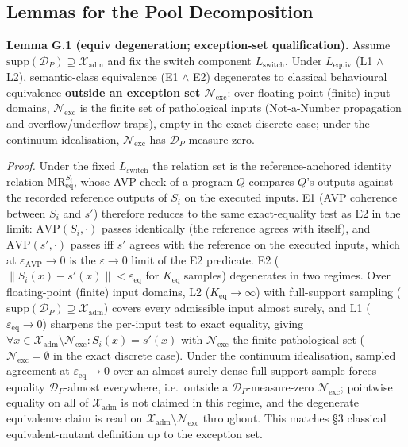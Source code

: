 \documentclass[manuscript,screen,review]{acmart}
\begin{document}
\subsection{Lemmas for the Pool Decomposition}\label{g.3-lemmas-three-state-decomposition-degenerates-under-l}

\textbf{Lemma G.1 (equiv degeneration; exception-set
qualification).} Assume
$\mathrm{supp}(\mathcal{D}_P) \supseteq \mathcal{X}_{\mathrm{adm}}$ and
fix the switch component $L_{\mathrm{switch}}$. Under
$L_{\mathrm{equiv}}$ (L1 $\wedge$ L2), semantic-class equivalence
(E1 $\wedge$ E2) degenerates to classical behavioural equivalence
\textbf{outside an exception set $\mathcal{N}_{\mathrm{exc}}$}: over
floating-point (finite) input domains, $\mathcal{N}_{\mathrm{exc}}$ is
the finite set of pathological inputs (Not-a-Number propagation and
overflow/underflow traps), empty in the exact discrete case; under the
continuum idealisation, $\mathcal{N}_{\mathrm{exc}}$ has
$\mathcal{D}_P$-measure zero.

\emph{Proof.} Under the fixed $L_{\mathrm{switch}}$ the relation set is
the reference-anchored identity relation
$\mathrm{MR}_{\mathrm{eq}}^{S_i}$, whose AVP check of a program $Q$
compares $Q$'s outputs against the recorded reference outputs of $S_i$
on the executed inputs. E1 (AVP coherence between $S_i$ and $s'$)
therefore reduces to the same exact-equality test as E2 in the limit:
$\mathrm{AVP}(S_i, \cdot)$ passes identically (the reference agrees with
itself), and $\mathrm{AVP}(s', \cdot)$ passes iff $s'$ agrees with the
reference on the executed inputs, which at
$\varepsilon_{\mathrm{AVP}} \to 0$ is the $\varepsilon \to 0$ limit of
the E2 predicate. E2
($\|S_i(x) - s'(x)\| < \varepsilon_{\mathrm{eq}}$ for $K_{\mathrm{eq}}$ samples)
degenerates in two regimes. Over floating-point (finite) input domains,
L2 ($K_{\mathrm{eq}} \to \infty$) with full-support sampling
($\mathrm{supp}(\mathcal{D}_P) \supseteq \mathcal{X}_{\mathrm{adm}}$)
covers every admissible input almost surely, and L1
($\varepsilon_{\mathrm{eq}} \to 0$) sharpens the per-input test to exact
equality, giving
$\forall x \in \mathcal{X}_{\mathrm{adm}} \setminus \mathcal{N}_{\mathrm{exc}}: S_i(x) = s'(x)$
with $\mathcal{N}_{\mathrm{exc}}$ the finite pathological set
($\mathcal{N}_{\mathrm{exc}} = \emptyset$ in the exact discrete case).
Under the continuum idealisation, sampled agreement at
$\varepsilon_{\mathrm{eq}} \to 0$ over an almost-surely dense
full-support sample forces equality $\mathcal{D}_P$-almost everywhere,
i.e.\ outside a $\mathcal{D}_P$-measure-zero
$\mathcal{N}_{\mathrm{exc}}$; pointwise equality on all of
$\mathcal{X}_{\mathrm{adm}}$ is not claimed in this regime, and the
degenerate equivalence claim is read on
$\mathcal{X}_{\mathrm{adm}} \setminus \mathcal{N}_{\mathrm{exc}}$
throughout. This matches \citet{d7c38286734419b52de4262c9802ebdfcf4b9447} §3 classical
equivalent-mutant definition up to the exception set.
\end{document}
